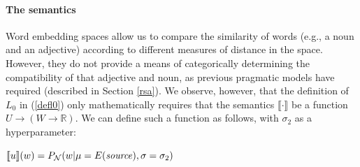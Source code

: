 \documentclass[9pt,twocolumn,twoside,lineno]{pnas-new}
\newcommand{\Listener}{L}
\newcommand{\QLONE}{\Listener_{{1}}^{{Q}}}
\begin{document}

			


	\paragraph{The semantics}



		Word embedding spaces allow us to compare the similarity of words (e.g., a noun and an adjective) according to different measures of distance in the space. However, they do not provide a means of categorically determining the compatibility of that adjective and noun, as previous pragmatic models have required (described in Section \ref{rsa}). We observe, however, that the definition of $L_0$ in (\ref{defl0}) only mathematically requires that the semantics $\llbracket \cdot \rrbracket$ be a function $U\to (W\to \mathbb{R})$. We can define such a function as follows, with $\sigma_2$ as a hyperparameter:
		\begin{examples}
		
		\item $\llbracket u\rrbracket(w) = P_{\mathcal{N}}(w\vert\mu=E(\textrm{\emph{source}}),\sigma=\sigma_2)$ \label{vect:sem}
		\end{examples}

\end{document}
